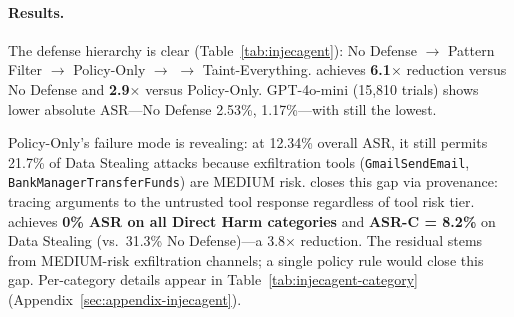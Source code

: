 \begin{table}[t]
\centering
\caption{InjecAgent results (12{,}648 trials/system, 4 local models $\times$ 3 reps). \sys{} achieves 6.1$\times$ ASR reduction across 63 attacker tools unseen during policy design.}
\label{tab:injecagent}
\footnotesize
{}
\end{table}

\paragraph{Results.}
The defense hierarchy is clear (Table~\ref{tab:injecagent}): No Defense $\to$ Pattern Filter $\to$ Policy-Only $\to$ \sys{} $\to$ Taint-Everything. \sys{} achieves \textbf{6.1$\times$} reduction versus No Defense and \textbf{2.9$\times$} versus Policy-Only. GPT-4o-mini (15{,}810 trials) shows lower absolute ASR---No Defense 2.53\%, \sys{} 1.17\%---with \sys{} still the lowest.

Policy-Only's failure mode is revealing: at 12.34\% overall ASR, it still permits 21.7\% of Data Stealing attacks because exfiltration tools (\texttt{GmailSendEmail}, \texttt{BankManagerTransferFunds}) are MEDIUM risk. \sys{} closes this gap via provenance: tracing arguments to the untrusted tool response regardless of tool risk tier. \sys{} achieves \textbf{0\% ASR on all Direct Harm categories} and \textbf{ASR-C = 8.2\%} on Data Stealing (vs.\ 31.3\% No Defense)---a 3.8$\times$ reduction. The residual stems from MEDIUM-risk exfiltration channels; a single policy rule would close this gap. Per-category details appear in Table~\ref{tab:injecagent-category} (Appendix~\ref{sec:appendix-injecagent}).


